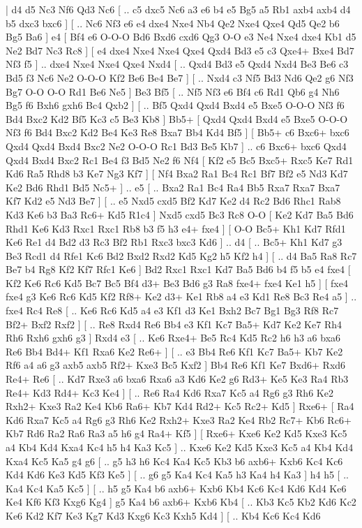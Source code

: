 \makegametitle 
|   d4   d5    Nc3   Nf6    Qd3   Nc6 [ .. c5  dxc5 Nc6  a3 e6  b4 e5  Bg5 a5  Rb1 axb4  axb4 d4  b5 dxc3  bxc6   ]  [ .. Nc6  Nf3 e6  e4 dxe4  Nxe4 Nb4  Qe2 Nxe4  Qxe4 Qd5  Qe2 b6  Bg5 Ba6   ]  e4 [  Bf4 e6  O-O-O Bd6  Bxd6 cxd6  Qg3 O-O  e3 Ne4  Nxe4 dxe4  Kb1 d5  Ne2 Bd7  Nc3 Rc8   ]  [  e4 dxe4  Nxe4 Nxe4  Qxe4 Qxd4  Bd3 e5  c3 Qxe4+  Bxe4 Bd7  Nf3 f5   ] .. dxe4    Nxe4   Nxe4    Qxe4   Nxd4 [ .. Qxd4  Bd3 e5  Qxd4 Nxd4  Be3 Be6  c3 Bd5  f3 Nc6  Ne2 O-O-O  Kf2 Be6  Be4 Be7   ]  [ .. Nxd4  c3 Nf5  Bd3 Nd6  Qe2 g6  Nf3 Bg7  O-O O-O  Rd1 Be6  Ne5   ]  Be3   Bf5 [ .. Nf5  Nf3 e6  Bf4 c6  Rd1 Qb6  g4 Nh6  Bg5 f6  Bxh6 gxh6  Bc4 Qxb2   ]  [ .. Bf5  Qxd4 Qxd4  Bxd4 e5  Bxe5 O-O-O  Nf3 f6  Bd4 Bxc2  Kd2 Bf5  Kc3 c5  Be3 Kb8   ]  Bb5+ [  Qxd4 Qxd4  Bxd4 e5  Bxe5 O-O-O  Nf3 f6  Bd4 Bxc2  Kd2 Be4  Ke3 Re8  Bxa7 Bb4  Kd4 Bf5   ]  [  Bb5+ c6  Bxc6+ bxc6  Qxd4 Qxd4  Bxd4 Bxc2  Ne2 O-O-O  Rc1 Bd3  Be5 Kb7   ] .. c6    Bxc6+   bxc6    Qxd4   Qxd4    Bxd4   Bxc2    Rc1   Be4    f3   Bd5    Ne2   f6    Nf4 [  Kf2 e5  Bc5 Bxc5+  Rxc5 Ke7  Rd1 Kd6  Ra5 Rhd8  b3 Ke7  Ng3 Kf7   ]  [  Nf4 Bxa2  Ra1 Bc4  Rc1 Bf7  Bf2 e5  Nd3 Kd7  Ke2 Bd6  Rhd1 Bd5  Nc5+   ] .. e5 [ .. Bxa2  Ra1 Bc4  Ra4 Bb5  Rxa7 Rxa7  Bxa7 Kf7  Kd2 e5  Nd3 Be7   ]  [ .. e5  Nxd5 cxd5  Bf2 Kd7  Ke2 d4  Rc2 Bd6  Rhc1 Rab8  Kd3 Ke6  b3 Ba3  Rc6+ Kd5  R1c4   ]  Nxd5   cxd5    Bc3   Rc8    O-O [  Ke2 Kd7  Ba5 Bd6  Rhd1 Ke6  Kd3 Rxc1  Rxc1 Rb8  b3 f5  h3 e4+  fxe4   ]  [  O-O Bc5+  Kh1 Kd7  Rfd1 Ke6  Re1 d4  Bd2 d3  Rc3 Bf2  Rb1 Rxc3  bxc3 Kd6   ] .. d4 [ .. Bc5+  Kh1 Kd7  g3 Be3  Rcd1 d4  Rfe1 Kc6  Bd2 Bxd2  Rxd2 Kd5  Kg2 h5  Kf2 h4   ]  [ .. d4  Ba5 Ra8  Rc7 Be7  b4 Rg8  Kf2 Kf7  Rfc1 Ke6   ]  Bd2   Rxc1    Rxc1   Kd7    Ba5   Bd6    b4   f5    b5   e4    fxe4 [  Kf2 Ke6  Rc6 Kd5  Bc7 Bc5  Bf4 d3+  Be3 Bd6  g3 Ra8  fxe4+ fxe4  Ke1 h5   ]  [  fxe4 fxe4  g3 Ke6  Rc6 Kd5  Kf2 Rf8+  Ke2 d3+  Ke1 Rb8  a4 e3  Kd1 Re8  Bc3 Re4  a5   ] .. fxe4    Rc4   Re8 [ .. Ke6  Rc6 Kd5  a4 e3  Kf1 d3  Ke1 Bxh2  Bc7 Bg1  Bg3 Rf8  Rc7 Bf2+  Bxf2 Rxf2   ]  [ .. Re8  Rxd4 Re6  Bb4 e3  Kf1 Kc7  Ba5+ Kd7  Ke2 Ke7  Rh4 Rh6  Rxh6 gxh6  g3   ]  Rxd4   e3 [ .. Ke6  Rxe4+ Be5  Rc4 Kd5  Rc2 h6  h3 a6  bxa6 Re6  Bb4 Bd4+  Kf1 Rxa6  Ke2 Re6+   ]  [ .. e3  Bb4 Re6  Kf1 Kc7  Ba5+ Kb7  Ke2 Rf6  a4 a6  g3 axb5  axb5 Rf2+  Kxe3 Bc5  Kxf2   ]  Bb4   Re6    Kf1   Ke7    Bxd6+   Rxd6    Re4+   Re6 [ .. Kd7  Rxe3 a6  bxa6 Rxa6  a3 Kd6  Ke2 g6  Rd3+ Ke5  Ke3 Ra4  Rb3 Re4+  Kd3 Rd4+  Kc3 Ke4   ]  [ .. Re6  Ra4 Kd6  Rxa7 Kc5  a4 Rg6  g3 Rh6  Ke2 Rxh2+  Kxe3 Ra2  Ke4 Kb6  Ra6+ Kb7  Kd4 Rd2+  Kc5 Rc2+  Kd5   ]  Rxe6+ [  Ra4 Kd6  Rxa7 Kc5  a4 Rg6  g3 Rh6  Ke2 Rxh2+  Kxe3 Ra2  Ke4 Rb2  Rc7+ Kb6  Rc6+ Kb7  Rd6 Ra2  Ra6 Ra3  a5 h6  g4 Ra4+  Kf5   ]  [  Rxe6+ Kxe6  Ke2 Kd5  Kxe3 Kc5  a4 Kb4  Kd4 Kxa4  Kc4 h5  h4 Ka3  Kc5   ] .. Kxe6    Ke2   Kd5    Kxe3   Kc5    a4   Kb4    Kd4   Kxa4    Kc5   Ka5    g4   g6 [ .. g5  h3 h6  Kc4 Ka4  Kc5 Kb3  b6 axb6+  Kxb6 Kc4  Kc6 Kd4  Kd6 Ke3  Kd5 Kf3  Ke5   ]  [ .. g6  g5 Ka4  Kc4 Ka5  h3 Ka4  h4 Ka3   ]  h4   h5 [ .. Ka4  Kc4 Ka5  Kc5   ]  [ .. h5  g5 Ka4  b6 axb6+  Kxb6 Kb4  Kc6 Kc4  Kd6 Kd4  Ke6 Ke4  Kf6 Kf3  Kxg6 Kg4   ]  g5   Ka4    b6   axb6+    Kxb6   Kb4 [ .. Kb3  Kc5 Kb2  Kd6 Kc2  Ke6 Kd2  Kf7 Ke3  Kg7 Kd3  Kxg6 Kc3  Kxh5 Kd4   ]  [ .. Kb4  Kc6 Kc4  Kd6 